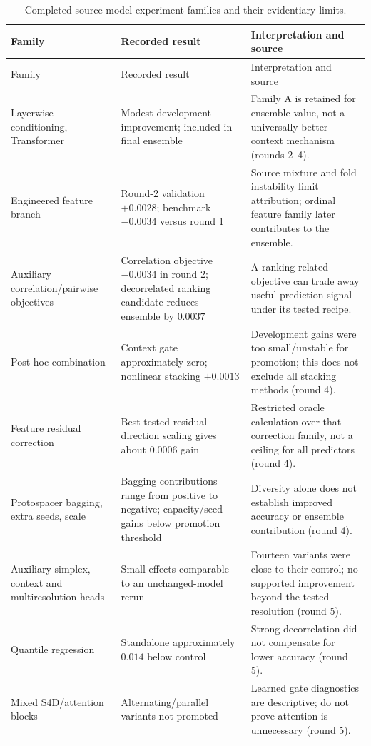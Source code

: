 \begin{longtable}{P{.23\linewidth}P{.28\linewidth}P{.40\linewidth}}
\caption{Completed source-model experiment families and their evidentiary limits.}\label{tab:negative}\\
\toprule Family & Recorded result & Interpretation and source \\
\midrule\endfirsthead
\toprule Family & Recorded result & Interpretation and source \\
\midrule\endhead
\bottomrule\endfoot
Layerwise conditioning, Transformer & Modest development improvement; included in final ensemble & Family A is retained for ensemble value, not a universally better context mechanism (rounds 2--4). \\
Engineered feature branch & Round-2 validation $+0.0028$; benchmark $-0.0034$ versus round 1 & Source mixture and fold instability limit attribution; ordinal feature family later contributes to the ensemble. \\
Auxiliary correlation/pairwise objectives & Correlation objective $-0.0034$ in round 2; decorrelated ranking candidate reduces ensemble by $0.0037$ & A ranking-related objective can trade away useful prediction signal under its tested recipe. \\
Post-hoc combination & Context gate approximately zero; nonlinear stacking $+0.0013$ & Development gains were too small/unstable for promotion; this does not exclude all stacking methods (round 4). \\
Feature residual correction & Best tested residual-direction scaling gives about $0.0006$ gain & Restricted oracle calculation over that correction family, not a ceiling for all predictors (round 4). \\
Protospacer bagging, extra seeds, scale & Bagging contributions range from positive to negative; capacity/seed gains below promotion threshold & Diversity alone does not establish improved accuracy or ensemble contribution (round 4). \\
Auxiliary simplex, context and multiresolution heads & Small effects comparable to an unchanged-model rerun & Fourteen variants were close to their control; no supported improvement beyond the tested resolution (round 5). \\
Quantile regression & Standalone approximately $0.014$ below control & Strong decorrelation did not compensate for lower accuracy (round 5). \\
Mixed S4D/attention blocks & Alternating/parallel variants not promoted & Learned gate diagnostics are descriptive; do not prove attention is unnecessary (round 5). \\

\end{longtable}
